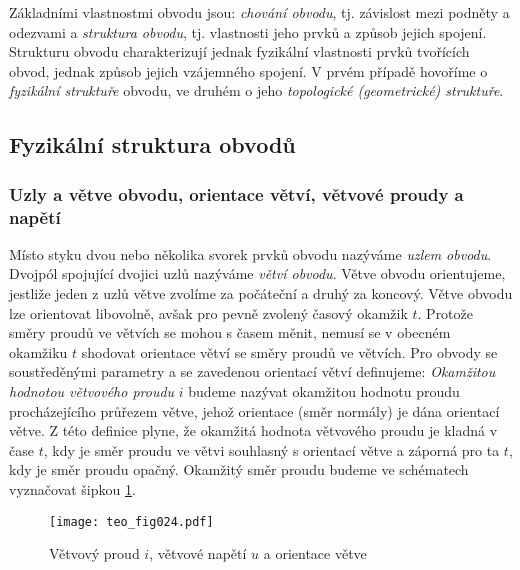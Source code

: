      Základními vlastnostmi obvodu jsou: \emph{chování obvodu}, tj. závislost mezi podněty a 
      odezvami a \emph{struktura obvodu}, tj. vlastnosti jeho prvků a způsob jejich spojení. 
      Strukturu obvodu charakterizují jednak fyzikální vlastnosti prvků tvořících obvod, jednak 
      způsob jejich vzájemného spojení. V prvém případě hovoříme o \emph{fyzikální struktuře} 
      obvodu, ve druhém o jeho \emph{topologické (geometrické) struktuře}\cite[s.~21]{Meyer1978}.
      
      
    \subsection{Fyzikální struktura obvodů} 
      \subsubsection{Uzly a větve obvodu, orientace větví, větvové proudy a 
      napětí}\label{TEO:chap_Term}
        Místo styku dvou nebo několika svorek prvků obvodu nazýváme \emph{uzlem obvodu}. Dvojpól 
        spojující dvojici uzlů nazýváme \emph{větví obvodu}. Větve obvodu orientujeme, jestliže 
        jeden z uzlů větve zvolíme za počáteční a druhý za koncový. Větve obvodu lze orientovat 
        libovolně, avšak pro pevně zvolený časový okamžik \(t\). Protože směry proudů ve větvích se 
        mohou s časem měnit, nemusí se v obecném okamžiku \(t\) shodovat orientace větví se směry 
        proudů ve větvích. Pro obvody se soustředěnými parametry a se zavedenou orientací větví 
        definujeme: \emph{Okamžitou hodnotou větvového proudu} \(i\) budeme nazývat okamžitou 
        hodnotu proudu procházejícího průřezem větve, jehož orientace (směr normály) je dána 
        orientací větve. Z této definice plyne, že okamžitá hodnota větvového proudu je kladná v 
        čase \(t\), kdy je směr proudu ve větvi souhlasný s orientací větve a záporná pro ta \(t\), 
        kdy je směr proudu opačný. Okamžitý směr proudu budeme ve schématech vyznačovat šipkou 
        \ref{teo:fig024}.

        \begin{figure}[ht!]  %
          \centering
          \texttt{[image: teo\_fig024.pdf]}
          \caption{Větvový proud \(i\), větvové napětí \(u\) a orientace větve}
          \label{teo:fig024}
        \end{figure}


